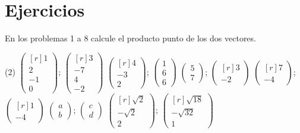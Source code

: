 \newpage

\section{Ejercicios}

\noindent
En los problemas 1 a 8 calcule el producto punto de los dos vectores.
\begin{tasks}[
    style=enumerate,
    ](2)
    \task $\begin{pmatrix*}[r] 1 \\ 2 \\ -1 \\ 0 \end{pmatrix*}$; $\begin{pmatrix*}[r] 3 \\ -7 \\ 4 \\ -2 \end{pmatrix*}$
    \task $\begin{pmatrix*}[r]4 \\ -3 \\ 2\end{pmatrix*}$; $\begin{pmatrix*}1 \\ 6 \\ 6\end{pmatrix*}$
    \task $\begin{pmatrix*}5 \\ 7\end{pmatrix*}$; $\begin{pmatrix*}[r]3 \\ -2\end{pmatrix*}$
    \task $\begin{pmatrix*}[r] 7 \\ -4 \end{pmatrix*}$; $\begin{pmatrix*}[r] 1 \\ -4 \end{pmatrix*}$
    \task $\begin{pmatrix*} a \\ b \end{pmatrix*}$; $\begin{pmatrix*} c \\ d \end{pmatrix*}$
    \task $\begin{pmatrix*}[r]\sqrt{2} \\ -\sqrt{2} \\ 2\end{pmatrix*}$; $\begin{pmatrix*}[r]\sqrt{18} \\-\sqrt{32} \\ 1\end{pmatrix*}$

\end{tasks}
